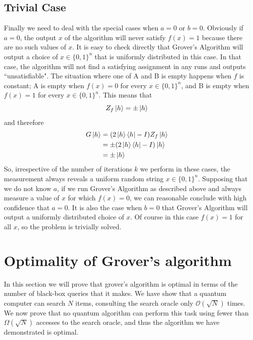 \subsection{Trivial Case}
Finally we need to deal with the special cases when $a=0$ or $b=0$. Obviously if $a=0$, the output $x$ of the algorithm will never satisfy $f(x)=1$ because there are no such values of $x$. It is easy to check directly that Grover's Algorithm will output a choice of $x \in \{0,1\}^n$ that is uniformly distributed in this case. In that case, the algorithm will not find a satisfying assignment in any runs and outputs ``unsatisfiable". The situation where one of A and B is empty happens when $f$ is constant; A is empty when $f(x)=0$ for every $x \in \{0,1\}^n$, and B is empty when $f(x)=1$ for every $x\in\{0,1\}^n$. This means that
\[
Z_f\ket{h}=\pm \ket{h}
\]
and therefore
\begin{align*}
    G\ket{h}&=(2\ket{h}\bra{h}-I)Z_f\ket{h}\\
    &=\pm (2\ket{h}\bra{h}-I)\ket{h}\\
    &=\pm \ket{h}
\end{align*}
So, irrespective of the number of iterations $k$ we perform in these cases, the measurement always reveals a uniform random string $x \in \{0,1\}^n$.
Supposing that we do not know $a$, if we run Grover's Algorithm as described above and always measure a value of $x$ for which $f(x)=0$, we can reasonable conclude with high confidence that $a=0$. It is also the case when $b=0$ that Grover's Algorithm will output a uniformly distributed choice of $x$. Of course in this case $f(x)=1$ for all $x$, so the problem is trivially solved.

\section{Optimality of Grover's algorithm}
In this section we will prove that grover's algorithm is optimal in terms of the number of black-box queries that it makes. We have show that a quantum computer can search $N$ items, consulting the search oracle only $\mathcal{O}(\sqrt{N})$ times. We now prove that no quantum algorithm can perform this task using fewer than $\Omega(\sqrt{N})$ accesses to the search oracle, and thus the algorithm we have demonstrated is optimal.

